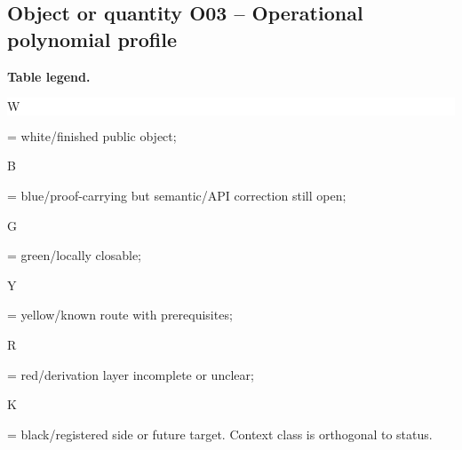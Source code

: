 \subsection*{Object or quantity O03 -- Operational polynomial profile}
\hypertarget{objproof:O03}{}
\par\smallskip\noindent\begin{minipage}{0.99\linewidth}\footnotesize\raggedright\textbf{Table legend.} \colorbox{white}{\strut W} = white/finished public object; \colorbox{cyan!20}{\strut B} = blue/proof-carrying but semantic/API correction still open; \colorbox{green!18}{\strut G} = green/locally closable; \colorbox{yellow!25}{\strut Y} = yellow/known route with prerequisites; \colorbox{red!20}{\strut R} = red/derivation layer incomplete or unclear; \colorbox{black!18}{\strut K} = black/registered side or future target. Context class is orthogonal to status.\end{minipage}\par\vspace{0.25em}
